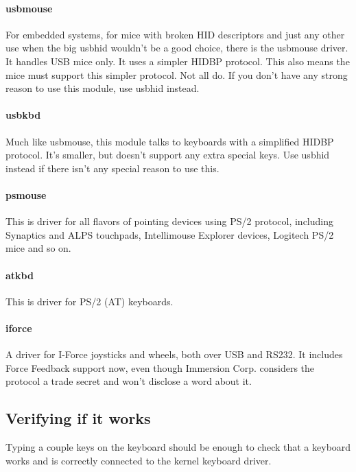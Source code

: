 \documentclass[a4paper,8pt,english]{sphinxmanual}
\begin{document}
\paragraph{usbmouse}
\label{input/input:usbmouse}
For embedded systems, for mice with broken HID descriptors and just any
other use when the big usbhid wouldn't be a good choice, there is the
usbmouse driver. It handles USB mice only. It uses a simpler HIDBP
protocol. This also means the mice must support this simpler protocol. Not
all do. If you don't have any strong reason to use this module, use usbhid
instead.


\paragraph{usbkbd}
\label{input/input:usbkbd}
Much like usbmouse, this module talks to keyboards with a simplified
HIDBP protocol. It's smaller, but doesn't support any extra special keys.
Use usbhid instead if there isn't any special reason to use this.


\paragraph{psmouse}
\label{input/input:psmouse}
This is driver for all flavors of pointing devices using PS/2
protocol, including Synaptics and ALPS touchpads, Intellimouse
Explorer devices, Logitech PS/2 mice and so on.


\paragraph{atkbd}
\label{input/input:atkbd}
This is driver for PS/2 (AT) keyboards.


\paragraph{iforce}
\label{input/input:iforce}
A driver for I-Force joysticks and wheels, both over USB and RS232.
It includes Force Feedback support now, even though Immersion
Corp. considers the protocol a trade secret and won't disclose a word
about it.


\subsection{Verifying if it works}
\label{input/input:verifying-if-it-works}
Typing a couple keys on the keyboard should be enough to check that
a keyboard works and is correctly connected to the kernel keyboard
driver.
\end{document}
